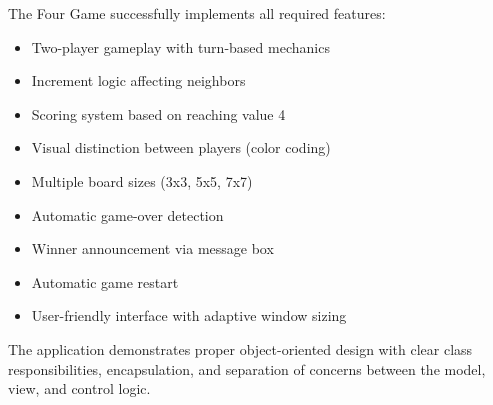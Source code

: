 \documentclass[12pt,a4paper]{article}
\begin{document}
The Four Game successfully implements all required features:
\begin{itemize}
    \item Two-player gameplay with turn-based mechanics
    \item Increment logic affecting neighbors
    \item Scoring system based on reaching value 4
    \item Visual distinction between players (color coding)
    \item Multiple board sizes (3x3, 5x5, 7x7)
    \item Automatic game-over detection
    \item Winner announcement via message box
    \item Automatic game restart
    \item User-friendly interface with adaptive window sizing
\end{itemize}

The application demonstrates proper object-oriented design with clear class responsibilities, encapsulation, and separation of concerns between the model, view, and control logic.
\end{document}
